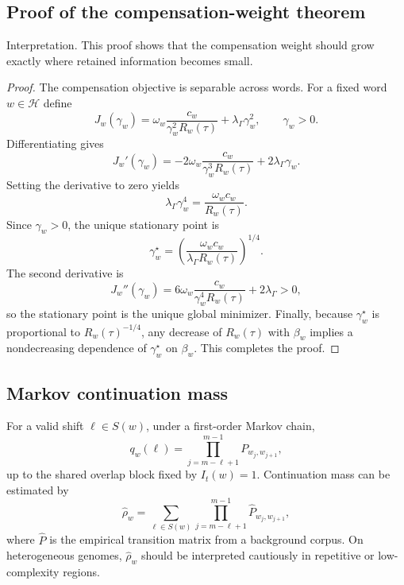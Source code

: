 \documentclass[11pt,a4paper]{article}
\begin{document}
\subsection{Proof of the compensation-weight theorem}\label{app:proofgamma}

Interpretation. This proof shows that the compensation weight should grow exactly where retained information becomes small.

\begin{proof}
The compensation objective is separable across words. For a fixed word $w \in \mathcal{H}$ define
\begin{equation}
J_w(\gamma_w)
=
\omega_w \frac{c_w}{\gamma_w^2 R_w(\tau)}
+
\lambda_{\Gamma}\gamma_w^2,
\qquad \gamma_w>0.
\label{eq:appjw}
\end{equation}
Differentiating gives
\begin{equation}
J_w'(\gamma_w)
=
-2\omega_w \frac{c_w}{\gamma_w^3 R_w(\tau)}
+
2\lambda_{\Gamma}\gamma_w.
\label{eq:appjprime}
\end{equation}
Setting the derivative to zero yields
\begin{equation}
\lambda_{\Gamma}\gamma_w^4
=
\frac{\omega_w c_w}{R_w(\tau)}.
\label{eq:appstationary}
\end{equation}
Since $\gamma_w>0$, the unique stationary point is
\begin{equation}
\gamma_w^{\star}
=
\left(
\frac{\omega_w c_w}{\lambda_{\Gamma}R_w(\tau)}
\right)^{1/4}.
\label{eq:appclosedform}
\end{equation}
The second derivative is
\begin{equation}
J_w''(\gamma_w)
=
6\omega_w \frac{c_w}{\gamma_w^4 R_w(\tau)}
+
2\lambda_{\Gamma}
>
0,
\label{eq:appsecond}
\end{equation}
so the stationary point is the unique global minimizer. Finally, because $\gamma_w^{\star}$ is proportional to $R_w(\tau)^{-1/4}$, any decrease of $R_w(\tau)$ with $\beta_w$ implies a nondecreasing dependence of $\gamma_w^{\star}$ on $\beta_w$. This completes the proof.
\end{proof}

\subsection{Markov continuation mass}\label{app:markov}

For a valid shift $\ell \in S(w)$, under a first-order Markov chain,
\begin{equation}
q_w(\ell)
=
\prod_{j=m-\ell+1}^{m-1}
P_{w_j,w_{j+1}},
\label{eq:appmarkovq}
\end{equation}
up to the shared overlap block fixed by $I_t(w)=1$. Continuation mass can be estimated by
\begin{equation}
\widehat{\rho}_w
=
\sum_{\ell \in S(w)}
\prod_{j=m-\ell+1}^{m-1}
\widehat{P}_{w_j,w_{j+1}},
\label{eq:appmarkovrho}
\end{equation}
where $\widehat{P}$ is the empirical transition matrix from a background corpus. On heterogeneous genomes, $\widehat{\rho}_w$ should be interpreted cautiously in repetitive or low-complexity regions.
\end{document}
